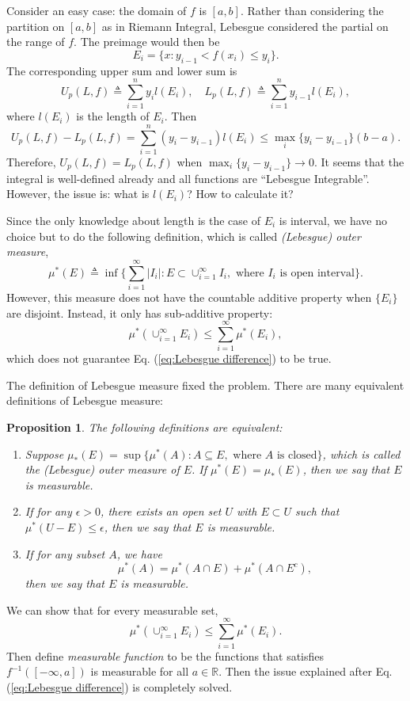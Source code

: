 \documentclass[12pt,a4paper]{report}
\numberwithin{equation}{section}
\theoremstyle{mystyle}
\newtheorem{proposition}[definition]{Proposition}
\newcommand{\R}{\mathbb{R}}
\begin{document}
	Consider an easy case: the domain of $f$ is $[a,b]$. Rather than considering the partition on $[a,b]$ as in Riemann Integral, Lebesgue considered the partial on the range of $f$. The preimage would then be
	$$
	E_i=\{x: y_{i-1}<f(x_i)\leq y_i\}.
	$$
	The corresponding upper sum and lower sum is
	$$
	U_p(L,f)\triangleq\sum_{i=1}^n y_i l(E_i),
	\quad
	L_p(L,f)\triangleq\sum_{i=1}^n y_{i-1} l(E_i),
	$$
	where $l(E_i)$ is the length of $E_i$. Then
	\begin{equation}\label{eq:Lebesgue difference}
		U_p(L,f)-L_p(L,f)=\sum_{i=1}^n (y_i-y_{i-1})l(E_i)\leq \max_i\{y_i-y_{i-1}\}(b-a).
	\end{equation}
	Therefore, $U_p(L,f)=L_p(L,f)$ when $\max_i\{y_i-y_{i-1}\}\to 0$. It seems that the integral is well-defined already and all functions are ``Lebesgue Integrable''. However, the issue is: what is $l(E_i)$? How to calculate it?
	
	Since the only knowledge about length is the case of $E_i$ is interval, we have no choice but to do the following definition, which is called \emph{(Lebesgue) outer measure},
	$$
	\mu^* (E)\triangleq \inf\{\sum_{i=1}^\infty |I_i|: E\subset \cup_{i=1}^\infty I_i, \text{ where $I_i$ is open interval}\}.
	$$
	However, this measure does not have the countable additive property when $\{E_i\}$ are disjoint. Instead, it only has sub-additive property:
	$$
	\mu^* (\cup_{i=1}^\infty E_i)\leq \sum_{i=1}^\infty \mu^* (E_i),
	$$
	which does not guarantee Eq. (\ref{eq:Lebesgue difference}) to be true. 
	
	The definition of Lebesgue measure fixed the problem. There are many equivalent definitions of Lebesgue measure:
	\begin{proposition}\label{prop:equivalent definitions of measurable}
		The following definitions are equivalent:
		\begin{enumerate}
			\item Suppose $\mu_*(E)=\sup\{\mu^*(A): A\subseteq E, \text{ where $A$ is closed}\}$, which is called the \emph{(Lebesgue) outer measure} of $E$. If $\mu^*(E)=\mu_*(E)$, then we say that $E$ is measurable.
			\item If for any $\epsilon>0$, there exists an open set $U$ with $E\subset U$ such that $\mu^*(U-E)\leq \epsilon$, then we say that $E$ is measurable.
			\item If for any subset $A$, we have
			\begin{equation}
				\mu^*(A) = \mu^*(A\cap E)+\mu^*(A\cap E^c),
			\end{equation}
			then we say that $E$ is measurable.
		\end{enumerate}
	\end{proposition}
	We can show that for every measurable set, 
	$$
	\mu^* (\cup_{i=1}^\infty E_i)\leq \sum_{i=1}^\infty \mu^* (E_i).
	$$
	Then define \emph{measurable function} to be the functions that satisfies $f^{-1}([-\infty,a])$ is measurable for all $a\in \R$. Then the issue explained after Eq. (\ref{eq:Lebesgue difference}) is completely solved.
	
\end{document}
